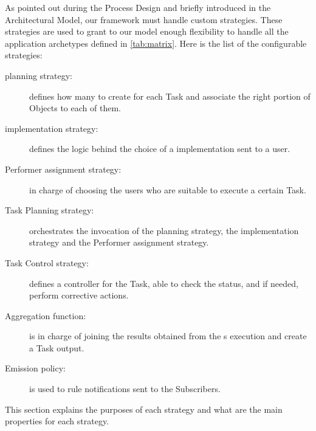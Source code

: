 
As pointed out during the Process Design and briefly introduced in the 
Architectural Model, our framework must handle custom strategies. These strategies
are used to grant to our model enough flexibility to handle all the application
archetypes defined in \autoref{tab:matrix}. Here is the list of the configurable
strategies:
\begin{description}
    \item[\utask{} planning strategy:] defines how many \utask{} to create for
    each Task and associate the right portion of Objects to each of them.
    \item[\utask{} implementation strategy:] defines the logic behind the choice
    of a \utask{} implementation sent to a user.
    \item[Performer assignment strategy:] in charge of choosing the users who
    are suitable to execute a certain Task.
    \item[Task Planning strategy:] orchestrates the invocation of the \utask{}
    planning strategy, the \utask{} implementation strategy and the Performer
    assignment strategy.
    \item[Task Control strategy:] defines a controller for the Task, able to
    check the status, and if needed, perform corrective actions.
    \item[Aggregation function:] is in charge of joining the results obtained
    from the \utask{}s execution and create a Task output.
    \item[Emission policy:] is used to rule notifications sent to the Subscribers.
\end{description}

\noindent This section explains the purposes of each strategy and what are the
main properties for each strategy.


